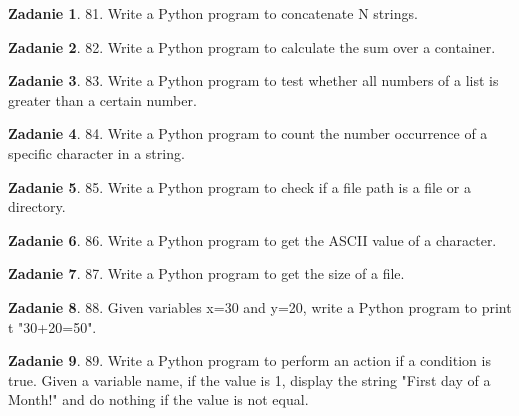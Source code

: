 \documentclass[11pt]{article}
\theoremstyle{definition}
\newtheorem{zadanie}{Zadanie}
\begin{document}
\begin{zadanie}


81. Write a Python program to concatenate N strings. 

\end{zadanie}

\begin{zadanie}


82. Write a Python program to calculate the sum over a container. 

\end{zadanie}

\begin{zadanie}


83. Write a Python program to test whether all numbers of a list is greater than a certain number. 

\end{zadanie}

\begin{zadanie}


84. Write a Python program to count the number occurrence of a specific character in a string. 

\end{zadanie}

\begin{zadanie}


85. Write a Python program to check if a file path is a file or a directory. 

\end{zadanie}

\begin{zadanie}


86. Write a Python program to get the ASCII value of a character. 

\end{zadanie}

\begin{zadanie}


87. Write a Python program to get the size of a file. 

\end{zadanie}

\begin{zadanie}


88. Given variables x=30 and y=20, write a Python program to print t "30+20=50". 

\end{zadanie}

\begin{zadanie}


89. Write a Python program to perform an action if a condition is true. 
Given a variable name, if the value is 1, display the string "First day of a Month!" and do nothing if the value is not equal.

\end{zadanie}
\end{document}
